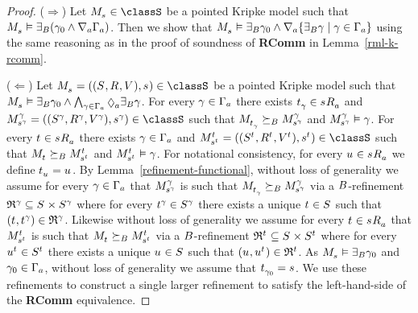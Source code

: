 \begin{proof}
($\Rightarrow$)
Let $\kPModel{\kStateS} \in \classS$ be a pointed Kripke model such that $\kPModel{\kStateS} \entails \somerefsBs (\gamma_0 \land \coversA \Gamma_\agentA)$.
Then we show that $\kPModel{\kStateS} \entails \somerefsBs \gamma_0 \land \coversA \{\somerefsBs \gamma \mid \gamma \in \Gamma_\agentA\}$ using the same reasoning as in the proof of soundness of {\bf RComm} in Lemma~\ref{rml-k-rcomm}.

($\Leftarrow$)
Let $\kPModelAndTuple{\kStateS} \in \classS$ be a pointed Kripke model such that $\kPModel{\kStateS} \entails \somerefsBs \gamma_0 \land \bigwedge_{\gamma \in \Gamma_\agentA} \possibleA \somerefsBs \gamma$.
For every $\gamma \in \Gamma_\agentA$ there exists $\kStateT_\gamma \in \kSuccessorsA{\kStateS}$ and $\kPModelAndTuple[\gamma]{\kStateS[\gamma]} \in \classS$ such that $\kPModel{\kStateT_\gamma} \simulatesBs \kPModel[\gamma]{\kStateS[\gamma]}$ and $\kPModel[\gamma]{\kStateS[\gamma]} \entails \gamma$.
For every $\kStateT \in \kSuccessorsA{\kStateS}$ there exists $\gamma \in \Gamma_\agentA$ and $\kPModelAndTuple[\kStateT]{\kStateS[\kStateT]} \in \classS$ such that $\kPModel{\kStateT} \simulatesBs \kPModel[\kStateT]{\kStateS[\kStateT]}$ and $\kPModel[\kStateT]{\kStateS[\kStateT]} \entails \gamma$.
For notational consistency, for every $\kStateU \in \kSuccessorsA{\kStateS}$ we define $\kStateT_{\kStateU} = \kStateU$.
By Lemma~\ref{refinement-functional}, without loss of generality we assume for every $\gamma \in \Gamma_\agentA$ that $\kPModel[\gamma]{\kStateS[\gamma]}$ is such that $\kPModel{\kStateT_\gamma} \simulatesBs \kPModel[\gamma]{\kStateS[\gamma]}$ via a $\agentsB$-refinement $\refinement^{\gamma} \subseteq \kStates \times \kStates[\gamma]$ where for every $\kStateT[\gamma] \in \kStates[\gamma]$ there exists a unique $\kStateT \in \kStates$ such that $(\kStateT, \kStateT[\gamma]) \in \refinement^{\gamma}$.
Likewise without loss of generality we assume for every $\kStateT \in \kSuccessorsA{\kStateS}$ that $\kPModel[\kStateT]{\kStateS[\kStateT]}$ is such that $\kPModel{\kStateT} \simulatesBs \kPModel[\kStateT]{\kStateS[\kStateT]}$ via a $\agentsB$-refinement $\refinement^{\kStateT} \subseteq \kStates \times \kStates[\kStateT]$ where for every $\kStateU[\kStateT] \in \kStates[\kStateT]$ there exists a unique $\kStateU \in \kStates$ such that $(\kStateU, \kStateU[\kStateT]) \in \refinement^{\kStateT}$.
As $\kPModel{\kStateS} \entails \somerefsBs \gamma_0$ and $\gamma_0 \in \Gamma_\agentA$, without loss of generality we assume that $\kStateT_{\gamma_0} = \kStateS$.
We use these refinements to construct a single larger refinement to satisfy the left-hand-side of the {\bf RComm} equivalence.


\end{proof}
